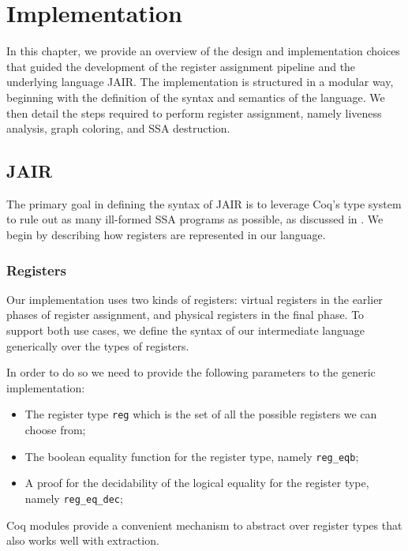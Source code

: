 
\chapter{Implementation}
\label{cha:implementation}

In this chapter, we provide an overview of the design and implementation choices that guided the development of the register assignment pipeline and the underlying language JAIR. The implementation is structured in a modular way, beginning with the definition of the syntax and semantics of the language. We then detail the steps required to perform register assignment, namely liveness analysis, graph coloring, and SSA destruction.

\section{JAIR}
\label{sec:jair}

The primary goal in defining the syntax of JAIR is to leverage Coq’s type system to rule out as many ill-formed SSA programs as possible, as discussed in . We begin by describing how registers are represented in our language.

\subsection{Registers}

Our implementation uses two kinds of registers: virtual registers in the earlier phases of register assignment, and physical registers in the final phase. To support both use cases, we define the syntax of our intermediate language generically over the types of registers.

In order to do so we need to provide the following parameters to the generic implementation:
\begin{itemize}
    \item The register type \texttt{reg} which is the set of all the possible registers we can choose from;
    \item The boolean equality function for the register type, namely \texttt{reg\_eqb};
    \item A proof for the decidability of the logical equality for the register type, namely \texttt{reg\_eq\_dec};
\end{itemize}

Coq modules provide a convenient mechanism to abstract over register types that also works well with extraction.

